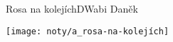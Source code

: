 \setcounter{page}{74}
\begin{song}{Rosa na kolejích}{D}{Wabi Daněk}
\begin{center}
\texttt{[image: noty/a\_rosa-na-kolejích]} 
\end{center}
\end{song} \pagebreak
